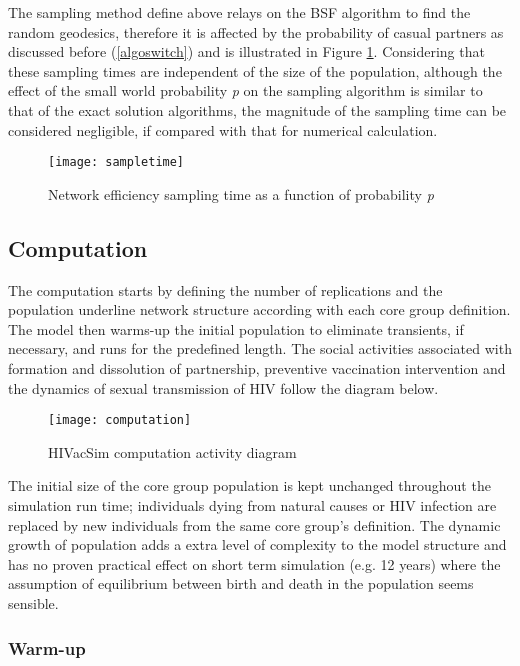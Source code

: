 The sampling method define above relays on the BSF algorithm to find the random
geodesics, therefore it is affected by the probability of casual partners as discussed
before (\ref{algoswitch}) and is illustrated in Figure \ref{sampletime}. Considering that
these sampling times are independent of the size of the population, although the effect
of the small world probability \emph{p} on the sampling algorithm is similar to that of
the exact solution algorithms, the magnitude of the sampling time can be considered
negligible, if compared with that for numerical calculation.
\begin{figure}[h]
\begin{center}
\texttt{[image: sampletime]}
\caption{Network efficiency sampling time as a function of probability \emph{p}}
\label{sampletime}
\end{center}
\end{figure}

\subsection{Computation}

The computation starts by defining the number of replications and the population
underline network structure according with each core group definition. The model then
warms-up the initial population to eliminate transients, if necessary, and runs for the
predefined length. The social activities associated with formation and dissolution of
partnership, preventive vaccination intervention and the dynamics of sexual transmission
of HIV follow the diagram below.
\begin{figure}[h]
\begin{center}
\texttt{[image: computation]}
\caption{HIVacSim computation activity diagram} \label{computation}
\end{center}
\end{figure}

The initial size of the core group population is kept unchanged throughout the simulation
run time; individuals dying from natural causes or HIV infection are replaced by new
individuals from the same core group's definition. The dynamic growth of population adds
a extra level of complexity to the model structure and has no proven practical effect on
short term simulation (e.g. 12 years) where the assumption of equilibrium between birth
and death in the population seems sensible.


\subsubsection{Warm-up}

